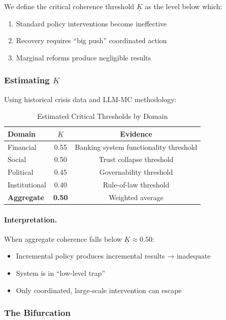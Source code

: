 We define the critical coherence threshold $\underline{K}$ as the level 
below which:
\begin{enumerate}
    \item Standard policy interventions become ineffective
    \item Recovery requires ``big push'' coordinated action
    \item Marginal reforms produce negligible results
\end{enumerate}

\subsubsection{Estimating $\underline{K}$}

Using historical crisis data and LLM-MC methodology:

\begin{table}[htbp]
\centering
\caption{Estimated Critical Thresholds by Domain}
\label{tab:thresholds}
\begin{tabular}{@{}lcc@{}}
\toprule
\textbf{Domain} & \textbf{$\underline{K}$} & \textbf{Evidence} \\
\midrule
Financial & 0.55 & Banking system functionality threshold \\
Social & 0.50 & Trust collapse threshold \\
Political & 0.45 & Governability threshold \\
Institutional & 0.40 & Rule-of-law threshold \\
\midrule
\textbf{Aggregate} & \textbf{0.50} & Weighted average \\
\bottomrule
\end{tabular}
\end{table}

\paragraph{Interpretation.}
When aggregate coherence falls below $\underline{K} \approx 0.50$:
\begin{itemize}
    \item Incremental policy produces incremental results → inadequate
    \item System is in ``low-level trap''
    \item Only coordinated, large-scale intervention can escape
\end{itemize}

\subsubsection{The Bifurcation}

